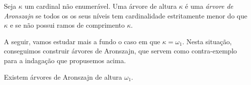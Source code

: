 \documentclass[a4paper]{article}
\begin{document}
  \begin{definition}
    Seja \(\kappa\) um cardinal não enumerável.
    Uma árvore de altura $\kappa$ é uma \textit{árvore de Aronszajn} se
    todos os os seus níveis tem cardinalidade estritamente menor do que \(\kappa\)
    e se não possui ramos de comprimento $\kappa$.
  \end{definition}

 A seguir, vamos estudar mais a fundo o caso em que \(\kappa=\omega_1\). Nesta
  situação, conseguimos construir árvores de Aronszajn, que servem como
  contra-exemplo  para a indagação que propusemos acima.
  
    \begin{teo}
  Existem árvores de Aronszajn de altura \(\omega_1\).
    \end{teo}
\end{document}
